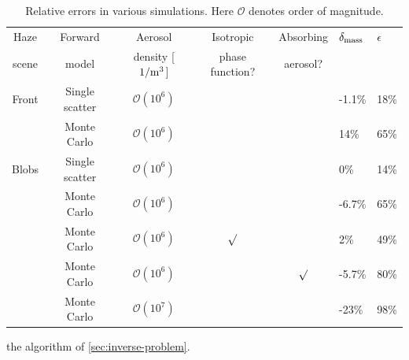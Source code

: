 \documentclass[10pt,letterpaper]{article}
\begin{document}
\begin{table}[t]
  \centering
  \begin{tabular}{cccccgg}
    \toprule
    Haze   & Forward        & Aerosol                 & Isotropic       & Absorbing & $\delta_{\rm mass}$ & $\epsilon~~$ \\
    scene  & model          & density [$1/{\rm m}^3$] & phase function? & aerosol?  &                     &              \\
     \midrule                                                                                             
    Front  & Single scatter & ${\mathcal{O}}(10^{6})$ &                 &           & -1.1\%               & 18\%         \\
           & Monte Carlo    & ${\mathcal{O}}(10^{6})$ &                 &           & 14\%               & 65\%         \\
    \cmidrule(r){1-5}                                                                                     
     Blobs & Single scatter & ${\mathcal{O}}(10^{6})$ &                 &           & 0\%                 & 14\%         \\
           & Monte Carlo    & ${\mathcal{O}}(10^{6})$ &                 &           & -6.7\%               & 65\%         \\
           & Monte Carlo    & ${\mathcal{O}}(10^{6})$ & $\surd$         &           & 2\%                & 49\%         \\
           & Monte Carlo    & ${\mathcal{O}}(10^{6})$ &                 & $\surd$   & -5.7\%               & 80\%         \\
           & Monte Carlo    & ${\mathcal{O}}(10^{7})$ &                 &           & -23\%                & 98\%         \\
    \bottomrule
  \end{tabular}
  \caption{Relative errors in various simulations. Here ${\mathcal{O}}$ denotes order of magnitude.}
  \label{tbl:mass}
\end{table}
the algorithm of \cref{sec:inverse-problem}. \\
\end{document}
